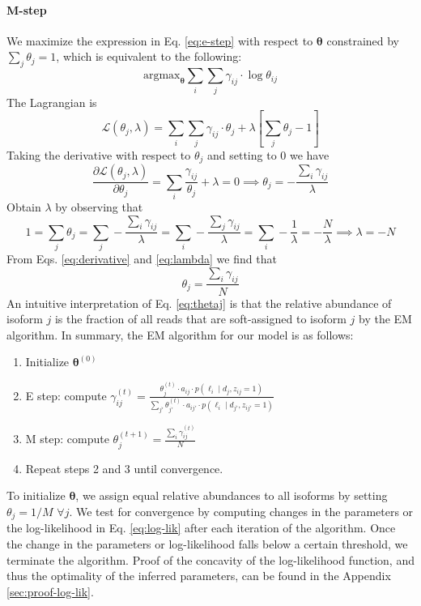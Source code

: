 \paragraph{M-step} We maximize the expression in Eq. \ref{eq:e-step} with respect to $\bm\theta$ constrained by $\sum_j\theta_j=1$, which is equivalent to the following:
\begin{equation}
    \mathrm{argmax}_{\bm\theta}\sum_i\sum_j\gamma_{ij}\cdot\log\theta_{ij}
\end{equation}
The Lagrangian is
\begin{equation}
    \mathcal{L}(\theta_j,\lambda)=\sum_i\sum_j\gamma_{ij}\cdot\theta_j + \lambda\left[\sum_j\theta_j-1\right]
\end{equation}
Taking the derivative with respect to $\theta_j$ and setting to $0$ we have
\begin{equation}
    \frac{\partial\mathcal{L}(\theta_j,\lambda)}{\partial\theta_j}=\sum_i\frac{\gamma_{ij}}{\theta_j}+\lambda=0\implies\theta_j=-\frac{\sum_i\gamma_{ij}}{\lambda}\label{eq:derivative}
\end{equation}
Obtain $\lambda$ by observing that
\begin{equation}
    1=\sum_j\theta_j=\sum_j-\frac{\sum_i\gamma_{ij}}{\lambda}=\sum_i-\frac{\sum_j\gamma_{ij}}{\lambda}=\sum_i-\frac{1}{\lambda}=-\frac{N}{\lambda}\implies\lambda=-N\label{eq:lambda}
\end{equation}
From Eqs. \ref{eq:derivative} and \ref{eq:lambda} we find that
\begin{equation}
    \theta_j=\frac{\sum_i\gamma_{ij}}{N}\label{eq:thetaj}
\end{equation}
An intuitive interpretation of Eq. \ref{eq:thetaj} is that the relative abundance of isoform $j$ is the fraction of all reads that are soft-assigned to isoform $j$ by the EM algorithm. In summary, the EM algorithm for our model is as follows:
\begin{enumerate}
    \item Initialize $\bm{\theta}^{(0)}$
    \item E step: compute $\gamma_{ij}^{(t)}=\frac{\theta_j^{(t)}\cdot a_{ij}\cdot p(\ell_i\mid d_j, z_{ij}=1)}{\sum_{j'}\theta_{j'}^{(t)}\cdot a_{ij'}\cdot p(\ell_i\mid d_{j'}, z_{ij'}=1)}$
    \item M step: compute $\theta_j^{(t+1)}=\frac{\sum_i\gamma_{ij}^{(t)}}{N}$
    \item Repeat steps 2 and 3 until convergence.
\end{enumerate}
To initialize $\bm\theta$, we assign equal relative abundances to all isoforms by setting $\theta_j=1/M$ $\forall j$. We test for convergence by computing changes in the parameters or the log-likelihood in Eq. \ref{eq:log-lik} after each iteration of the algorithm. Once the change in the  parameters or log-likelihood falls below a certain threshold, we terminate the algorithm. Proof of the concavity of the log-likelihood function, and thus the optimality of the inferred parameters, can be found in the Appendix \ref{sec:proof-log-lik}. 

